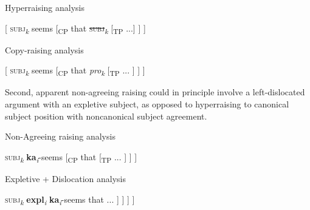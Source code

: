 \documentclass[output=paper,colorlinks,citecolor=brown
]{langscibook}
\begin{document}
\ea\label{ex:johnson:TirikiCPRaised2}

\begin{xlist}

\ex\label{ex:johnson:TirikiCPRaisedHR}


{{Hyperraising analysis}}

[ \textsc{subj}\textsubscript{\textit{k}} seems [\textsubscript{CP} that \sout{\textsc{subj}}\textsubscript{\textit{k}} [\textsubscript{TP} ...] ] ]

\ex\label{ex:johnson:TirikiCPRaisedCR}

{{Copy-raising analysis}}

[ \textsc{subj}\textsubscript{\textit{k}} seems [\textsubscript{CP} that \textit{pro}\textsubscript{\textit{k}} [\textsubscript{TP} ... ] ] ]

\end{xlist}
\z 

\noindent Second, apparent non-agreeing raising could in principle involve a left-dislocated argument with an expletive subject, as opposed to hyperraising to canonical subject position with noncanonical subject agreement.

\begin{exe}
\ex \label{ex:johnson:PossibleGaAnalyses} 
\begin{xlist}

\ex \label{ex:johnson:SampleNonAgreeingRaising}
{{Non-Agreeing raising analysis}}

 \textsc{subj}\textsubscript{\textit{k}} \textbf{ka}\textsubscript{\textit{i}}-seems [\textsubscript{CP} that  [\textsubscript{TP} ... ] ] ]

\ex \label{ex:johnson:ExpletivePlusDislocation}
{{Expletive + Dislocation analysis}}

 \textsc{subj}\textsubscript{\textit{k}}  \textbf{expl}\textsubscript{\textit{i}} \textbf{ka}\textsubscript{\textit{i}}-seems  that   ... ] ] ] ]

\end{xlist}
\end{exe}
\end{document}
